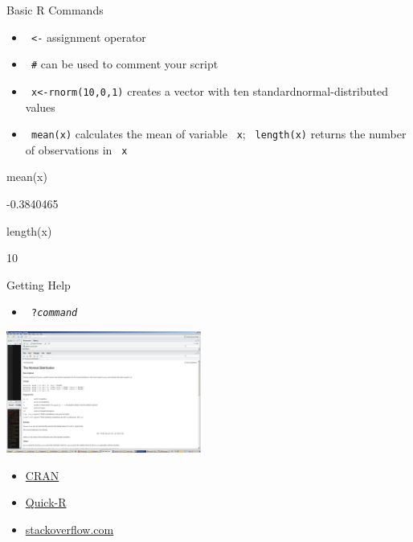 \documentclass[11pt,german,hideothersubsections]{beamer}
\newcommand{\R}[1]{{\tt \color{blue}  #1}}
\begin{document}
\begin{frame}[fragile]{Basic R Commands}
\begin{itemize}
\item \R{<-}  assignment operator
\item \R{\#} can be used to comment your script
\item \R{x<-rnorm(10,0,1)}  creates a vector with ten standardnormal-distributed values
\item \R{mean(x)} calculates the mean of variable \R{x}; \R{length(x)} returns the number of observations in \R{x}
\end{itemize}
\begin{Schunk}
\begin{Sinput}
 mean(x)
\end{Sinput}
\begin{Soutput}
[1] -0.3840465
\end{Soutput}
\begin{Sinput}
 length(x)
\end{Sinput}
\begin{Soutput}
[1] 10
\end{Soutput}
\end{Schunk}
\end{frame}
\begin{frame}[fragile]{Getting Help}
\begin{itemize}
\item \R{?\emph{command}}
\end{itemize}
\includegraphics[width=\textwidth, height=4cm]{../../../tutorial/figure/rhlep.png}
\begin{itemize}
\item \href{https://cran.r-project.org}{CRAN}
\item \href{http://www.statmethods.net}{Quick-R}
\item \href{http://stackoverflow.com/questions/tagged/r}{stackoverflow.com}
\end{itemize}

\end{frame}
\end{document}
